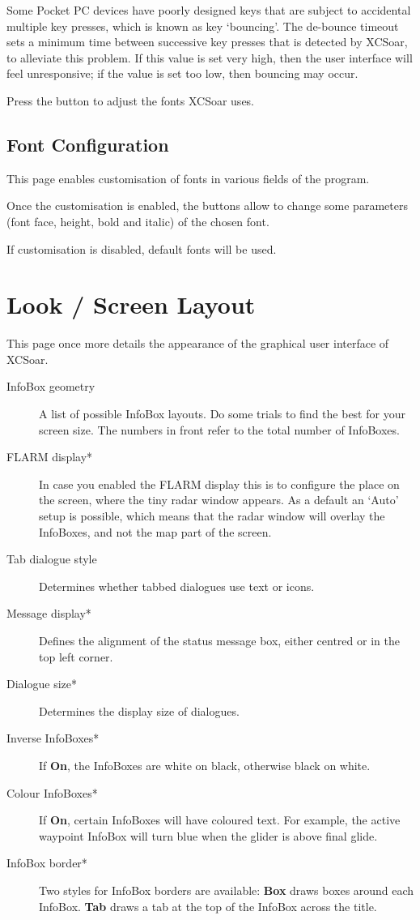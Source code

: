 Some Pocket PC devices have poorly designed keys that are subject to
accidental multiple key presses, which is known as key `bouncing'.  The
de-bounce timeout sets a minimum time between successive key presses
that is detected by XCSoar, to alleviate this problem.  If this value
is set very high, then the user interface will feel unresponsive; if
the value is set too low, then bouncing may occur.

Press the  button to adjust the fonts XCSoar uses.

\subsection*{Font Configuration}

This page enables customisation of fonts in various fields of the program.


Once the customisation is enabled, the  buttons allow to change 
some parameters (font face, height, bold and italic) of the chosen font.

If customisation is disabled, default fonts will be used.


\section{Look / Screen Layout}\label{sec:interface-appearance}

This page once more details the appearance of the graphical user interface of XCSoar.

\begin{description}
\item[InfoBox geometry]  A list of possible InfoBox layouts. Do some trials to find the 
  best for your screen size. The numbers in front refer to the total number of 
  InfoBoxes.
\item[FLARM display*]  \label{conf:flarmradar-place}
  In case you enabled the FLARM display this is to configure the
  place on the screen, where the tiny radar window appears. As a default an `Auto' setup 
  is possible, which means that the radar window will overlay the InfoBoxes, and not the map
  part of the screen.
\item[Tab dialogue style]  Determines whether tabbed dialogues use text or icons.
\item[Message display*]  Defines the alignment of the status message box, either 
  centred or in the top left corner.
\item[Dialogue size*]  Determines the display size of dialogues.
\item[Inverse InfoBoxes*]  If {\bf On}, the InfoBoxes are white on black, otherwise 
  black on white.
\item[Colour InfoBoxes*]  If {\bf On}, certain InfoBoxes will have coloured text. For 
  example, the active waypoint InfoBox will turn blue when the glider is above final 
  glide.
\item[InfoBox border*]  Two styles for InfoBox borders are available: {\bf Box} draws 
  boxes around each InfoBox. {\bf Tab} draws a tab at the top of the InfoBox across the 
  title.
\end{description}


